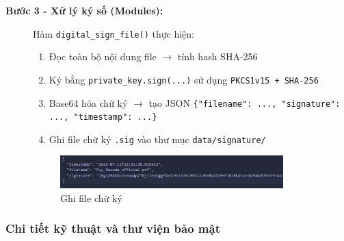 \begin{description}
    \item[\textbf{Bước 3 - Xử lý ký số (Modules):}]
    Hàm \texttt{digital\_sign\_file()} thực hiện:
    \begin{enumerate}
        \item Đọc toàn bộ nội dung file $\rightarrow$ tính hash SHA-256
        \item Ký bằng \texttt{private\_key.sign(...)} sử dụng \texttt{PKCS1v15 + SHA-256}
        \item Base64 hóa chữ ký $\rightarrow$ tạo JSON \texttt{\{"filename": ..., "signature": ..., "timestamp": ...\}}
        \item Ghi file chữ ký \texttt{.sig} vào thư mục \texttt{data/signature/}
    \end{enumerate}

    \begin{figure}[H]
        \centering
        \includegraphics[width=0.85\textwidth]{img/8_sign/8_sign_json.png}
        \caption{Ghi file chữ ký}
    \end{figure}
\end{description}

\subsubsection*{Chi tiết kỹ thuật và thư viện bảo mật}

